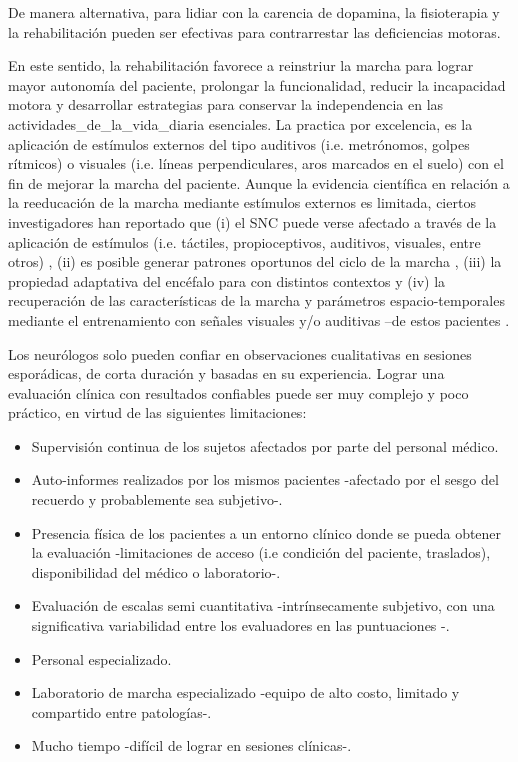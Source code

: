 De manera alternativa, para lidiar con la carencia de dopamina, la fisioterapia y la rehabilitación pueden ser efectivas para contrarrestar las deficiencias motoras.

En este sentido, la rehabilitación favorece a reinstriur la marcha para lograr mayor autonomía del paciente, prolongar la funcionalidad, reducir la incapacidad motora y desarrollar estrategias para conservar la independencia en las \gls{actividades_de_la_vida_diaria} esenciales. La practica por excelencia, es la aplicación de estímulos externos del tipo auditivos (i.e. metrónomos, golpes rítmicos) o visuales (i.e. líneas perpendiculares, aros marcados en el suelo) con el fin de mejorar la marcha del paciente. Aunque la evidencia científica en relación a la reeducación de la marcha mediante estímulos externos es limitada, ciertos investigadores han reportado que (i) el \gls{SNC} puede verse afectado a través de  la aplicación de estímulos (i.e. táctiles, propioceptivos, auditivos, visuales, entre otros) \cite{Moros2000}, (ii) es posible generar patrones oportunos del ciclo de la marcha \cite{MorrisME1994,Morris1996}, (iii) la propiedad adaptativa del encéfalo para con distintos contextos \cite{Garces2014} y (iv) la recuperación de las características de la marcha y parámetros espacio-temporales mediante el entrenamiento con señales visuales y/o auditivas --de estos pacientes \cite{Ostrosky2000,PALACIOSNAVARRO201649,Mille2012} \cite{Moros2000,Dias2017TREINODM,Almeida2012}.
        

Los neurólogos solo pueden confiar en observaciones cualitativas en sesiones esporádicas, de corta duración y basadas en su experiencia. Lograr una evaluación clínica con resultados confiables puede ser muy complejo y poco práctico, en virtud de las siguientes limitaciones:
\begin{itemize}
    \item Supervisión continua de los sujetos afectados por parte del personal médico.
    \item Auto-informes realizados por los mismos pacientes -afectado por el sesgo del recuerdo y probablemente sea subjetivo-.
    \item Presencia física de los pacientes a un entorno clínico donde se pueda obtener la evaluación -limitaciones de acceso (i.e condición del paciente, traslados), disponibilidad del médico o laboratorio-.
    \item Evaluación de escalas semi cuantitativa -intrínsecamente subjetivo, con una significativa variabilidad entre los evaluadores en las puntuaciones \cite{Parisi2015}-.
    \item Personal especializado.
    \item Laboratorio de marcha especializado -equipo de alto costo, limitado y compartido entre patologías-.
    \item Mucho tiempo -difícil de lograr en sesiones clínicas-.
\end{itemize}

